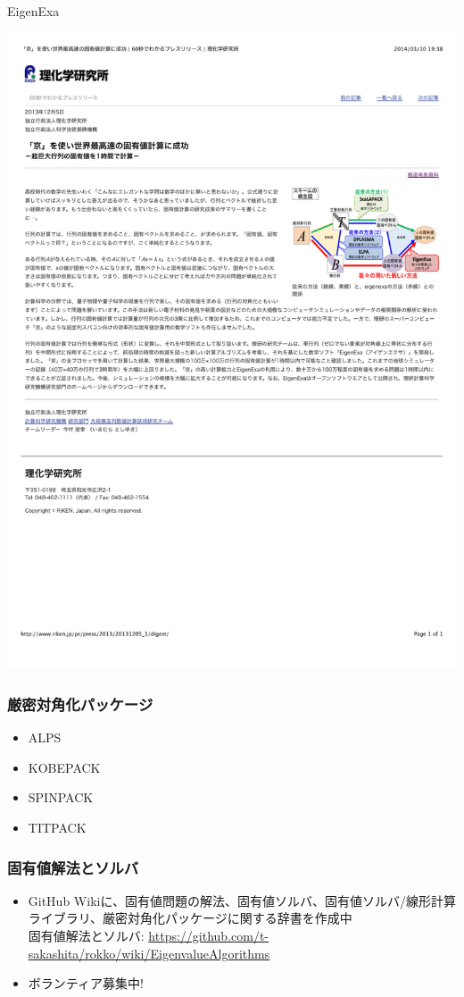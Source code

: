 \begin{frame}{EigenExa}
  \begin{center}
    \includegraphics[height=0.8\textheight]{figure/eigenexa.pdf}
  \end{center}
\end{frame}

\begin{frame}
  \frametitle{厳密対角化パッケージ}
  \begin{itemize}
  \item ALPS
  \item KOBEPACK
  \item SPINPACK
  \item TITPACK
  \end{itemize}
\end{frame}

\begin{frame}
  \frametitle{固有値解法とソルバ}
  \begin{itemize}
    \item GitHub Wikiに、固有値問題の解法、固有値ソルバ、固有値ソルバ/線形計算ライブラリ、厳密対角化パッケージに関する辞書を作成中 \\
      固有値解法とソルバ: \url{https://github.com/t-sakashita/rokko/wiki/EigenvalueAlgorithms}
    \item ボランティア募集中!
  \end{itemize}
\end{frame}
        

